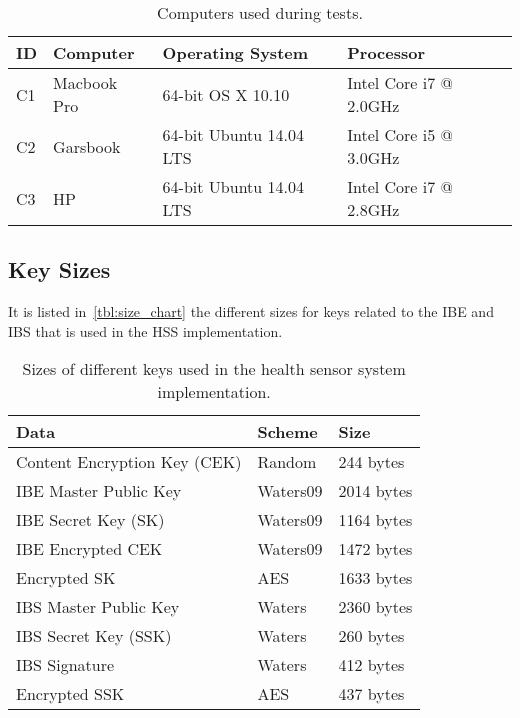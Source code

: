 \begin{table}[h]
  \begin{tabular}{llll}
  ID      & Computer                  & Operating System          & Processor                    \\ \hline
  C1      & Macbook Pro               & 64-bit OS X 10.10         & Intel Core i7 @ 2.0GHz       \\ %
  C2      & Garsbook                  & 64-bit Ubuntu 14.04 LTS   & Intel Core i5 @ 3.0GHz       \\ %
  C3      & HP                        & 64-bit Ubuntu 14.04 LTS   & Intel Core i7 @ 2.8GHz       \\ %
  \end{tabular}
  \caption{Computers used during tests.}
  \label{tbl:target_computers}
\end{table}

\subsection{Key Sizes}
It is listed in~\autoref{tbl:size_chart} the different sizes for keys related to the \gls{IBE} and \gls{IBS} that is used in the \gls{HSS} implementation.

\begin{table}[h]
  \begin{tabular}[c]{p{}p{}p{}}
  Data                            & Scheme          & Size              \\ \hline
  Content Encryption Key (CEK)    & Random          & 244 bytes         \\ %
  IBE Master Public Key           & Waters09        & 2014 bytes        \\ %
  IBE Secret Key (SK)             & Waters09        & 1164 bytes        \\ %
  IBE Encrypted CEK               & Waters09        & 1472 bytes        \\ %
  Encrypted SK                    & AES             & 1633 bytes        \\ %
  IBS Master Public Key           & Waters          & 2360 bytes        \\ %
  IBS Secret Key (SSK)            & Waters          & 260 bytes         \\ %
  IBS Signature                   & Waters          & 412 bytes         \\ %
  Encrypted SSK                   & AES             & 437 bytes         \\ %
  \end{tabular}
  \caption{Sizes of different keys used in the health sensor system implementation.}
  \label{tbl:size_chart}
\end{table}


